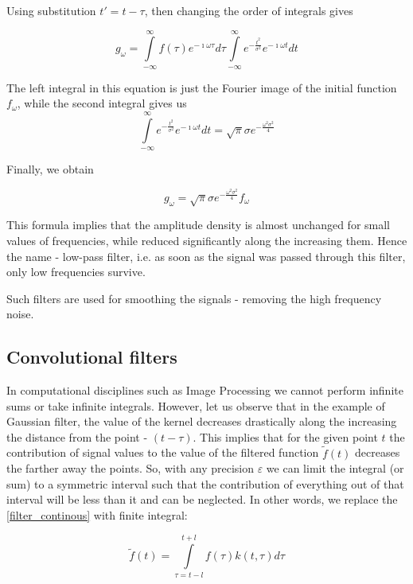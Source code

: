 \documentclass[11pt]{book}
\begin{document}
Using substitution $t' = t - \tau$, then changing the order of integrals gives

\begin{equation}
g_\omega = \int\limits_{-\infty}^\infty f(\tau) e^{-\imath\omega \tau}d\tau \int\limits_{-\infty}^\infty e^{-\frac {t^2}{\sigma^2}} e^{-\imath\omega t }dt
\end{equation}

The left integral in this equation is just the Fourier image of the initial function $f_\omega$, while the second integral gives us
\begin{equation}
\int\limits_{-\infty}^\infty e^{-\frac {t^2}{\sigma^2}} e^{-\imath\omega t }dt = \sqrt{\pi} \sigma e^{-\frac{\omega^2 \sigma^2}{4}}
\end{equation}

Finally, we obtain

\begin{equation}
g_\omega = \sqrt{\pi} \sigma e^{-\frac{\omega^2 \sigma^2}{4}} f_\omega
\end{equation}

This formula implies that the amplitude density is almost unchanged for small values of frequencies, while reduced significantly along the increasing them. Hence the name - low-pass filter, i.e. as soon as the signal was passed through this filter, only low frequencies survive. 

Such filters are used for smoothing the signals - removing the high frequency noise.

\subsection{Convolutional filters}

In computational disciplines such as Image Processing we cannot perform infinite sums or take infinite integrals. However, let us observe that in the example of Gaussian filter, the value of the kernel decreases drastically along the increasing the distance from the point - $(t-\tau)$. This implies that for the given point $t$ the contribution of signal values to the value of the filtered function $\tilde{f}(t)$ decreases the farther away the points. So, with any precision $\varepsilon$ we can limit the integral (or sum) to a symmetric interval such that the contribution of everything out of that interval will be less than it and can be neglected. In other words, we replace the \eqref{filter_continous}  with finite integral:

\begin{equation}
\tilde{f}(t) = \int\limits_{\tau = t -l}^{t+l}f(\tau) k(t,\tau) d\tau\label{sliding_integral}
\end{equation}
\end{document}
